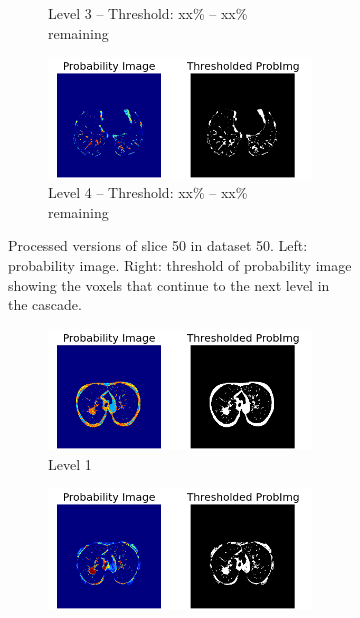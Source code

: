 \begin{figure}[p]
\begin{center}
\begin{subfigure}[b]{0.5\linewidth}
\begin{subfigure}[b]{\linewidth}
			\caption{Level 3 -- Threshold: xx\% -- xx\% remaining}
		\end{subfigure}
		\begin{subfigure}[b]{\linewidth}
			\includegraphics[width=\linewidth]{img/cascades/D50L4S50.png}
			\caption{Level 4 -- Threshold: xx\% -- xx\% remaining}
		\end{subfigure}
	  \caption{Processed versions of slice 50 in dataset 50. Left: probability
	  image. Right: threshold of probability image showing the voxels that continue
	  to the next level in the cascade.}
	  \label{fig:d50s50}
  \end{subfigure}
  \begin{subfigure}[b]{0.5\linewidth}
  		\begin{subfigure}[b]{\linewidth}
			\includegraphics[width=\linewidth]{img/cascades/D50L1S95.png}
			\caption{Level 1}
		\end{subfigure}
		\begin{subfigure}[b]{\linewidth}
			\includegraphics[width=\linewidth]{img/cascades/D50L2S95.png}

\end{subfigure}
\end{subfigure}
\end{center}
\end{figure}
